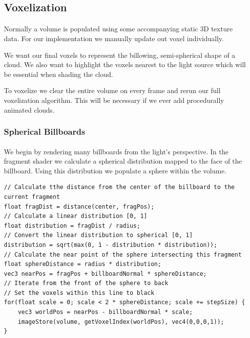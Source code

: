 \subsection{Voxelization}\paragraph{}
Normally a volume is populated using some accompanying static 3D texture data. For our implementation we manually update out voxel individually. 

We want our final voxels to represent the billowing, semi-spherical shape of a cloud. We also want to  highlight the voxels nearest to the light source which will be essential when shading the cloud. 

To voxelize we clear the entire volume on every frame and rerun our full voxelization algorithm. This will be necessary if we ever add procedurally animated clouds. 

\subsubsection{Spherical Billboards}\paragraph{}
We begin by rendering many billboards from the light's perspective. In the fragment shader we calculate a spherical distribution mapped to the face of the billboard. Using this distribution we populate a sphere within the volume. 

\begin{lstlisting}[caption={first\_voxelize.glsl, 42}]
// Calculate tthe distance from the center of the billboard to the current fragment
float fragDist = distance(center, fragPos);
// Calculate a linear distribution [0, 1]
float distribution = fragDist / radius;
// Convert the linear distribution to spherical [0, 1]
distribution = sqrt(max(0, 1 - distribution * distribution));
// Calculate the near point of the sphere intersecting this fragment
float sphereDistance = radius * distribution;
vec3 nearPos = fragPos + billboardNormal * sphereDistance;
// Iterate from the front of the sphere to back 
// Set the voxels within this line to black
for(float scale = 0; scale < 2 * sphereDistance; scale += stepSize) {
	vec3 worldPos = nearPos - billboardNormal * scale;
	imageStore(volume, getVoxelIndex(worldPos), vec4(0,0,0,1));
}
\end{lstlisting}\paragraph{}

